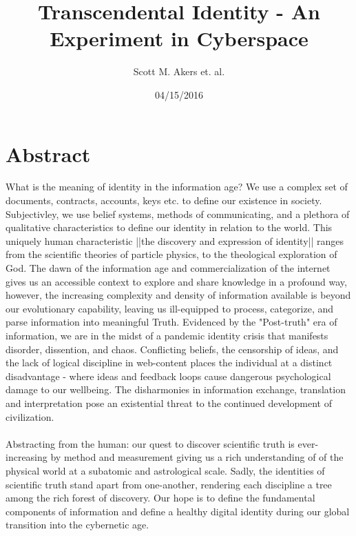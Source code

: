 \documentclass{article}
\title{Transcendental Identity - An Experiment in Cyberspace}
\date{04/15/2016}
\author{Scott M. Akers et. al.}
\begin{document}
	\maketitle
	\newpage

	\tableofcontents
	\newpage
\section{Abstract}
	What is the meaning of identity in the information age?  We use a complex set of documents, contracts, accounts, keys etc. to define our existence in society.  Subjectivley, we use belief systems, methods of communicating, and a plethora of qualitative characteristics to define our identity in relation to the world.  This uniquely human characteristic ||the discovery and expression of identity|| ranges from the scientific theories of particle physics, to the theological exploration of God.  The dawn of the information age and commercialization of the internet gives us an accessible context to explore and share knowledge in a profound way, however, the increasing complexity and density of information available is beyond our evolutionary capability, leaving us ill-equipped to process, categorize, and parse information into meaningful Truth.  Evidenced by the "Post-truth" era of information, we are in the midst of a pandemic identity crisis that manifests disorder, dissention, and chaos.  Conflicting beliefs, the censorship of ideas, and the lack of logical discipline in web-content places the individual at a distinct disadvantage - where ideas and feedback loops cause dangerous psychological damage to our wellbeing.  The disharmonies in information exchange, translation and interpretation pose an existential threat to the continued development of civilization.   \\\\ 
Abstracting from the human: our quest to discover scientific truth is ever-increasing by method and measurement giving us a rich understanding of of the physical world at a subatomic and astrological scale.  Sadly, the identities of scientific truth stand apart from one-another, rendering each discipline a tree among the rich forest of discovery.  Our hope is to define the fundamental components of information and define a healthy digital identity during our global transition into the cybernetic age. 
 
\end{document}

